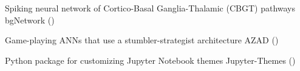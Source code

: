 \vspace*{0.25cm}

\vspace*{0.35cm}

\begin{cventries}
  \cventry
    {Spiking neural network of Cortico-Basal Ganglia-Thalamic (CBGT) pathways} %
    {bgNetwork ()} %
    {\vspace*{-0.05cm}} %
    {\vspace*{-0.05cm}} %
    {
    }
    \vspace*{-0.2cm}

  \cventry
    {Game-playing ANNs that use a stumbler-strategist architecture} %
    {AZAD ()} %
    {\vspace*{-0.05cm}} %
    {\vspace*{-0.05cm}} %
    {
    }
    \vspace*{-0.2cm}

  \cventry
    {Python package for customizing Jupyter Notebook themes} %
    {Jupyter-Themes ()} %
    {\vspace*{-0.05cm}} %
    {\vspace*{-0.05cm}} %
    {
    }
    \vspace*{-0.2cm}


\end{cventries}
